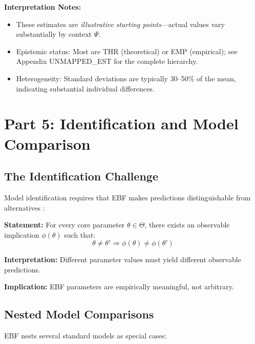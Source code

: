 \textbf{Interpretation Notes:}
\begin{itemize}[nosep]
\item These estimates are \textit{illustrative starting points}---actual values
vary substantially by context $\Psi$.
\item Epistemic status: Most are THR (theoretical) or EMP (empirical); see
Appendix UNMAPPED_EST for the complete hierarchy.
\item Heterogeneity: Standard deviations are typically 30--50\% of the mean,
indicating substantial individual differences.
\end{itemize}


\section{Part 5: Identification and Model Comparison}
\label{sec:az-identification}

\subsection{The Identification Challenge}

Model identification requires that EBF makes predictions distinguishable
from alternatives \citep{manski1995identification}:

\begin{tcolorbox}[colback=gray!5!white, colframe=gray!75!black,
    title=Axiom AZ-I1: Falsifiability Requirement]
\textbf{Statement:} For every core parameter $\theta \in \Theta$, there exists
an observable implication $\phi(\theta)$ such that:
\begin{equation}
\theta \neq \theta' \Rightarrow \phi(\theta) \neq \phi(\theta')
\end{equation}

\textbf{Interpretation:} Different parameter values must yield different observable predictions.

\textbf{Implication:} EBF parameters are empirically meaningful, not arbitrary.
\end{tcolorbox}

\subsection{Nested Model Comparisons}

EBF nests several standard models as special cases:

